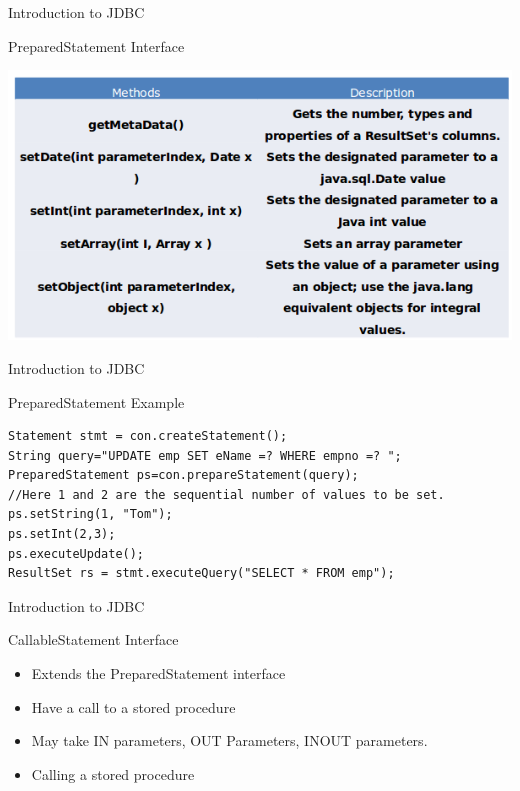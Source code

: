 \documentclass[14pt]{beamer}
\begin{document}
\begin{frame}[fragile]{Introduction to JDBC}
\begin{block}{}
PreparedStatement Interface
\end{block}
\begin{center}
    \includegraphics[scale=0.5]{JEE-M03-S01-Image11.png}
  \end{center}
\end{frame}

\begin{frame}[fragile]{Introduction to JDBC}
\begin{block}{}
PreparedStatement Example
\end{block}
\begin{lstlisting}[numbers=none]
Statement stmt = con.createStatement();
String query="UPDATE emp SET eName =? WHERE empno =? ";
PreparedStatement ps=con.prepareStatement(query);
//Here 1 and 2 are the sequential number of values to be set.
ps.setString(1, "Tom");
ps.setInt(2,3);
ps.executeUpdate();
ResultSet rs = stmt.executeQuery("SELECT * FROM emp");
\end{lstlisting}
\end{frame}

\begin{frame}[fragile]{Introduction to JDBC}
\begin{block}{}
CallableStatement Interface
\end{block}
\begin{itemize}
\item Extends the PreparedStatement interface
\item Have a call to a stored procedure 
\item May take IN parameters, OUT Parameters, INOUT parameters.
\item Calling a stored procedure
\end{itemize}
\end{frame}
\end{document}
